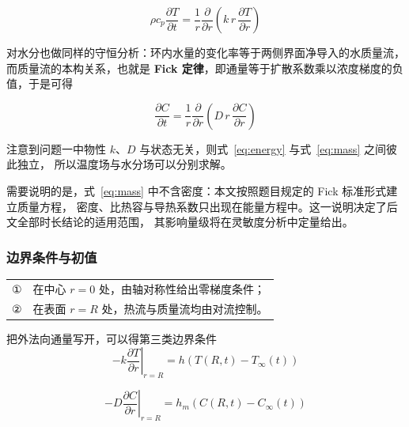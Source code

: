 \begin{equation}
\rho c_p\frac{\partial T}{\partial t}
=\frac{1}{r}\frac{\partial}{\partial r}\left(k\,r\,\frac{\partial T}{\partial r}\right)
\label{eq:energy}
\end{equation}


对水分也做同样的守恒分析：环内水量的变化率等于两侧界面净导入的水质量流，
而质量流的本构关系，也就是\textbf{ Fick 定律}，即通量等于扩散系数乘以浓度梯度的负值，于是可得

\begin{equation}
\frac{\partial C}{\partial t}
=\frac{1}{r}\frac{\partial}{\partial r}\left(D\,r\,\frac{\partial C}{\partial r}\right)
\label{eq:mass}
\end{equation}


注意到问题一中物性 $k$、$D$ 与状态无关，则式~\eqref{eq:energy} 与式~\eqref{eq:mass} 之间彼此独立，
所以温度场与水分场可以分别求解。


需要说明的是，式~\eqref{eq:mass} 中不含密度：本文按照题目规定的 Fick 标准形式建立质量方程，
密度、比热容与导热系数只出现在能量方程中。这一说明决定了后文全部时长结论的适用范围，
其影响量级将在灵敏度分析中定量给出。

\subsubsection{边界条件与初值}


\begin{tabular}{@{}p{1.4em}p{}@{}}
① & 在中心 \(r=0\) 处，由轴对称性给出零梯度条件；\\[2pt]
② & 在表面 \(r=R\) 处，热流与质量流均由对流控制。\\
\end{tabular}


把外法向通量写开，可以得第三类边界条件
\begin{equation}
\left.-k\frac{\partial T}{\partial r}\right|_{r=R}
=h\left(T(R,t)-T_\infty(t)\right)
\label{eq:bc}
\end{equation}

\begin{equation}
\left.-D\frac{\partial C}{\partial r}\right|_{r=R}
=h_m\left(C(R,t)-C_\infty(t)\right)
\label{eq:bcm}
\end{equation}

